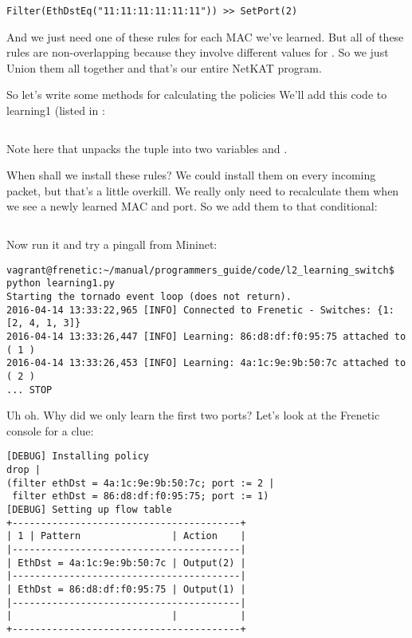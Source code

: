 \begin{verbatim}
Filter(EthDstEq("11:11:11:11:11:11")) >> SetPort(2)
\end{verbatim}

And we just need one of these rules for each MAC we've learned.  But all of these rules are non-overlapping
because they involve different values for .  So we just Union them all together and that's
our entire NetKAT program.

So let's write some methods for calculating the policies
We'll add this code to learning1 (listed in :

\inputminted[firstline=23,lastline=31]{python}{code/l2_learning_switch/learning2.py}

Note here that  unpacks the tuple  into two variables
 and .

When shall we install these rules?   We could install them on every incoming packet, but that's a little
overkill. We really only need to recalculate them when we see a newly learned MAC and port.  So we add them
to that conditional:

\inputminted[firstline=42,lastline=44]{python}{code/l2_learning_switch/learning2.py}

Now run it and try a pingall from Mininet:

\begin{verbatim}
vagrant@frenetic:~/manual/programmers_guide/code/l2_learning_switch$ python learning1.py
Starting the tornado event loop (does not return).
2016-04-14 13:33:22,965 [INFO] Connected to Frenetic - Switches: {1: [2, 4, 1, 3]}
2016-04-14 13:33:26,447 [INFO] Learning: 86:d8:df:f0:95:75 attached to ( 1 )
2016-04-14 13:33:26,453 [INFO] Learning: 4a:1c:9e:9b:50:7c attached to ( 2 )
... STOP
\end{verbatim}

Uh oh.  Why did we only learn the first two ports?   Let's look at the Frenetic console for a clue:

\begin{verbatim}
[DEBUG] Installing policy
drop |
(filter ethDst = 4a:1c:9e:9b:50:7c; port := 2 |
 filter ethDst = 86:d8:df:f0:95:75; port := 1)
[DEBUG] Setting up flow table
+----------------------------------------+
| 1 | Pattern                | Action    |
|----------------------------------------|
| EthDst = 4a:1c:9e:9b:50:7c | Output(2) |
|----------------------------------------|
| EthDst = 86:d8:df:f0:95:75 | Output(1) |
|----------------------------------------|
|                            |           |
+----------------------------------------+
\end{verbatim}

